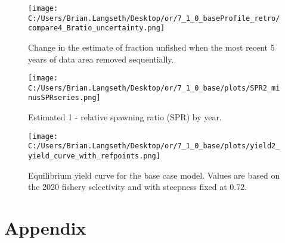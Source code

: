 \documentclass[11pt,
  english,
  a4paper,
]{article}
\begin{document}

\begin{figure}
\centering
\texttt{[image: C:/Users/Brian.Langseth/Desktop/or/7\_1\_0\_baseProfile\_retro/compare4\_Bratio\_uncertainty.png]}
\caption{Change in the estimate of fraction unfished when the most recent 5 years of data area removed sequentially.\label{fig:retro-depl}}
\end{figure}

\tagmcend\tagstructend


\begin{figure}
\centering
\texttt{[image: C:/Users/Brian.Langseth/Desktop/or/7\_1\_0\_base/plots/SPR2\_minusSPRseries.png]}
\caption{Estimated 1 - relative spawning ratio (SPR) by year.\label{fig:1-spr}}
\end{figure}

\tagmcend\tagstructend


\begin{figure}
\centering
\texttt{[image: C:/Users/Brian.Langseth/Desktop/or/7\_1\_0\_base/plots/yield2\_yield\_curve\_with\_refpoints.png]}
\caption{Equilibrium yield curve for the base case model. Values are based on the 2020 fishery selectivity and with steepness fixed at 0.72.\label{fig:yield}}
\end{figure}

\tagmcend\tagstructend

\newpage

\clearpage


\hypertarget{appendix}{%
\section{Appendix}\label{appendix}}

\leavevmode\tagmcend\tagstructend
\end{document}
